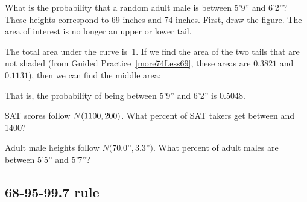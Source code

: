 \begin{examplewrap}
\begin{nexample}{What is the probability that a random adult
    male is between 5'9'' and 6'2''?}
  These heights correspond to 69 inches and 74 inches.
  First, draw the figure.
  The area of interest is no longer an upper or lower
  tail.\vspace{-2mm}
  \begin{center}
  \vspace{-2mm}
  \end{center}
  The total area under the curve is~1.
  If we find the area of the two tails that are not shaded
  (from Guided Practice~\ref{more74Less69}, these areas are
  $0.3821$ and $0.1131$), then we can find the middle
  area:\vspace{-2mm}
  \begin{center}
  \vspace{-2mm}
  \end{center}
  That is, the probability of being between 5'9'' and 6'2''
  is 0.5048.
\end{nexample}
\end{examplewrap}

\begin{exercisewrap}
\begin{nexercise}
SAT scores follow $N(1100{}, 200{})$.
What percent of SAT takers get between \satmean{} and
1400?\footnotemark
\end{nexercise}
\end{exercisewrap}

\begin{exercisewrap}
\begin{nexercise}
Adult male heights follow $N(70.0$''$, 3.3$''$)$.
What percent of adult males are between 5'5''
and 5'7''?\footnotemark{}
\end{nexercise}
\end{exercisewrap}


\subsection{68-95-99.7 rule}

